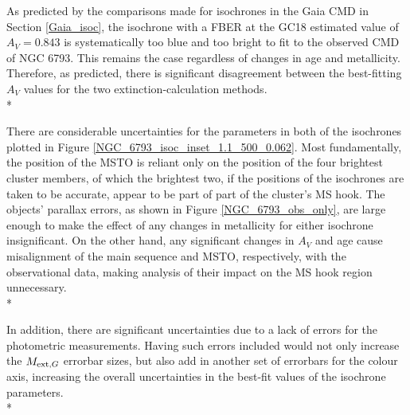 \documentclass[12pt, a4paper]{report}
\begin{document}
As predicted by the comparisons made for isochrones in the Gaia CMD in Section \ref{Gaia_isoc}, the isochrone with a FBER at the GC18 estimated value of $A_{V} = 0.843$ is systematically too blue and too bright to fit to the observed CMD of NGC 6793. This remains the case regardless of changes in age and metallicity. Therefore, as predicted, there is significant disagreement between the best-fitting $A_{V}$ values for the two extinction-calculation methods.\\*

There are considerable uncertainties for the parameters in both of the isochrones plotted in Figure \ref{NGC_6793_isoc_inset_1.1_500_0.062}. Most fundamentally, the position of the MSTO is reliant only on the position of the four brightest cluster members, of which the brightest two, if the positions of the isochrones are taken to be accurate, appear to be part of part of the cluster's MS hook. The objects' parallax errors, as shown in Figure \ref{NGC_6793_obs_only}, are large enough to make the effect of any changes in metallicity for either isochrone insignificant. On the other hand, any significant changes in $A_{V}$ and age cause misalignment of the main sequence and MSTO, respectively, with the observational data, making analysis of their impact on the MS hook region unnecessary.\\*

In addition, there are significant uncertainties due to a lack of errors for the photometric measurements. Having such errors included would not only increase the $M_{\textnormal{ext},G}$ errorbar sizes, but also add in another set of errorbars for the colour axis, increasing the overall uncertainties in the best-fit values of the isochrone parameters. \\*
\end{document}
